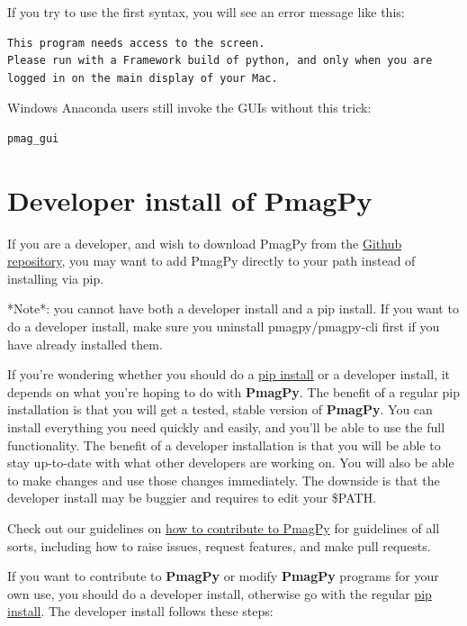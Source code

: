 \documentclass[11pt]{book}
\begin{document}
{If you try to use the first syntax, you will see an error message like this:

\begin{verbatim}
This program needs access to the screen.
Please run with a Framework build of python, and only when you are
logged in on the main display of your Mac.
\end{verbatim}

\noindent Windows Anaconda users still invoke the GUIs without this trick:

\begin{verbatim}
pmag_gui
\end{verbatim}


\section{Developer install of PmagPy}

If you are a developer, and wish to download PmagPy from the \href{https://github.com/PmagPy/PmagPy}{Github repository}, you may want to add PmagPy directly to your path instead of installing via pip.

*Note*: you cannot have both a developer install and a pip install.  If you want to do a developer install, make sure you uninstall pmagpy/pmagpy-cli first if you have already installed them.

If you're wondering whether you should do a \href{#pip_install}{pip install} or a developer install, it depends on what you're hoping to do with {\bf PmagPy}.  The benefit of a regular pip installation is that you will get a tested, stable version of {\bf PmagPy}.  You can install everything you need quickly and easily, and you'll be able to use the full functionality.  The benefit of a developer installation is that you will be able to stay up-to-date with what other developers are working on.  You will also be able to make changes and use those changes immediately.  The downside is that the developer install may be buggier and requires to edit your \$PATH.

Check out our guidelines on \href{https://github.com/PmagPy/PmagPy/blob/master/CONTRIBUTING.md}{how to contribute to PmagPy} for guidelines of all sorts, including how to raise issues, request features, and make pull requests.

If you want to contribute to {\bf PmagPy} or modify {\bf PmagPy} programs for your own use, you should do a developer install, otherwise go with the regular \href{#pip_install}{pip install}.  The developer install follows these steps:

}
\end{document}
